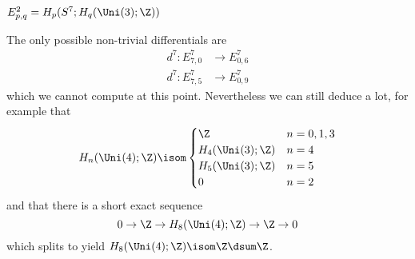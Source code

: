 \begin{example}
\begin{center}
 \\
		$E^2_{p, q} = H_p(S^7; H_q(\Uni(3); \Z))$
	\end{center}
	The only possible non-trivial differentials are
	\begin{align*}
		d^7\colon E^7_{7, 0} &\to E^7_{0, 6} \\
		d^7\colon E^7_{7, 5} &\to E^7_{0, 9}
	\end{align*}
	which we cannot compute at this point.
	Nevertheless we can still deduce a lot, for example that
	\begin{equation*}
		H_n(\Uni(4); \Z) \isom \begin{cases}
			\Z 					& n = 0, 1, 3 \\
			H_4(\Uni(3); \Z) 	& n = 4 \\
			H_5(\Uni(3); \Z) 	& n = 5 \\
			0 					& n = 2
		\end{cases}
	\end{equation*}
	and that there is a short exact sequence
	\begin{equation*}
		0 \to \Z \to H_8(\Uni(4); \Z) \to \Z \to 0
	\end{equation*}
	which splits to yield $H_8(\Uni(4); \Z) \isom \Z \dsum \Z$.
\end{example}


